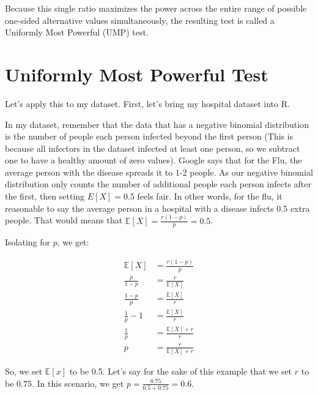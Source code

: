 \documentclass[
  letterpaper,
  DIV=11,
  numbers=noendperiod]{scrreprt}
\newenvironment{Shaded}{\begin{snugshade}}{\end{snugshade}}
\newcommand{\NormalTok}[1]{\textcolor[rgb]{0.00,0.23,0.31}{#1}}
\begin{document}
Because this single ratio maximizes the power across the entire range of
possible one-sided alternative values simultaneously, the resulting test
is called a Uniformly Most Powerful (UMP) test.

\section{Uniformly Most Powerful
Test}\label{uniformly-most-powerful-test}

Let's apply this to my dataset. First, let's bring my hospital dataset
into R.

\begin{Shaded}
\end{Shaded}

In my dataset, remember that the data that has a negative binomial
distribution is the number of people each person infected beyond the
first person (This is because all infectors in the dataset infected at
least one person, so we subtract one to have a healthy amount of zero
values). Google says that for the Flu, the average person with the
disease spreads it to 1-2 people. As our negative binomial distribution
only counts the number of additional people each person infects after
the first, then setting \(E[X] = 0.5\) feels fair. In other words, for
the flu, it reasonable to say the average person in a hospital with a
disease infects 0.5 extra people. That would means that
\(\mathbb{E}[X] = \frac{r(1-p)}{p} = 0.5\).

Isolating for \(p\), we get:

\[
\begin{aligned}
\mathbb{E}[X] &= \frac{r(1-p)}{p} \\
\frac{p}{1-p} &= \frac{r}{\mathbb{E}[X]} \\
\frac{1-p}{p} &= \frac{\mathbb{E}[X]}{r} \\
\frac{1}{p} - 1 &= \frac{\mathbb{E}[X]}{r} \\
\frac{1}{p} &= \frac{\mathbb{E}[X] + r}{r} \\
p &= \frac{r}{\mathbb{E}[X] + r}
\end{aligned}
\]

So, we set \(\mathbb{E}[x]\) to be 0.5. Let's say for the sake of this
example that we set \(r\) to be \(0.75\). In this scenario, we get
\(p = \frac{0.75}{0.5+0.75} = 0.6\).
\end{document}
